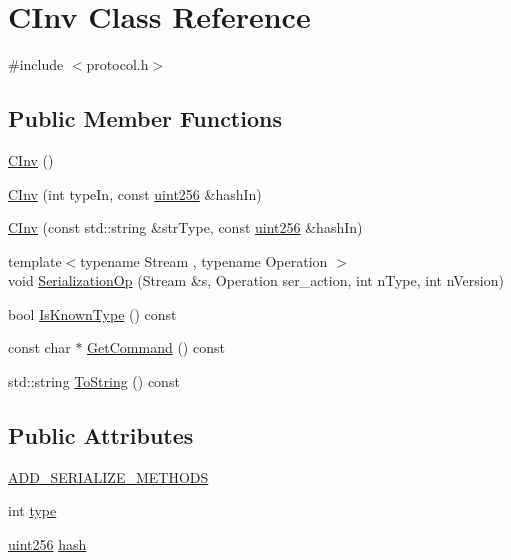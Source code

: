 \hypertarget{class_c_inv}{}\section{C\+Inv Class Reference}
\label{class_c_inv}


{\ttfamily \#include $<$protocol.\+h$>$}

\subsection*{Public Member Functions}
\begin{DoxyCompactItemize}
\item 
\mbox{\hyperlink{class_c_inv_a831d208e5e1b142e36a89999b81c2298}{C\+Inv}} ()
\item 
\mbox{\hyperlink{class_c_inv_a4c6e02df7b10378f876ecc76c6b50301}{C\+Inv}} (int type\+In, const \mbox{\hyperlink{classuint256}{uint256}} \&hash\+In)
\item 
\mbox{\hyperlink{class_c_inv_a412cb8fdd0bfe185f770fec91a3e13c4}{C\+Inv}} (const std\+::string \&str\+Type, const \mbox{\hyperlink{classuint256}{uint256}} \&hash\+In)
\item 
{\footnotesize template$<$typename Stream , typename Operation $>$ }\\void \mbox{\hyperlink{class_c_inv_a7f56c1696e6c5c7ca36c1637f94dd1a0}{Serialization\+Op}} (Stream \&s, Operation ser\+\_\+action, int n\+Type, int n\+Version)
\item 
bool \mbox{\hyperlink{class_c_inv_a3da7d96ce51443a1bfe8ce5342d0afbe}{Is\+Known\+Type}} () const
\item 
const char $\ast$ \mbox{\hyperlink{class_c_inv_a29020c06b49edebfe9993adee93cf65a}{Get\+Command}} () const
\item 
std\+::string \mbox{\hyperlink{class_c_inv_a5bf13e9595035d2155b04cceb848c37d}{To\+String}} () const
\end{DoxyCompactItemize}
\subsection*{Public Attributes}
\begin{DoxyCompactItemize}
\item 
\mbox{\hyperlink{class_c_inv_a3dc91b40ff6fe8c2c8879c81de67e209}{A\+D\+D\+\_\+\+S\+E\+R\+I\+A\+L\+I\+Z\+E\+\_\+\+M\+E\+T\+H\+O\+DS}}
\item 
int \mbox{\hyperlink{class_c_inv_a2da8a26c6b8824011e3144459d278c75}{type}}
\item 
\mbox{\hyperlink{classuint256}{uint256}} \mbox{\hyperlink{class_c_inv_abfa04c38e9c0def9a2b09a9c43929744}{hash}}
\end{DoxyCompactItemize}
